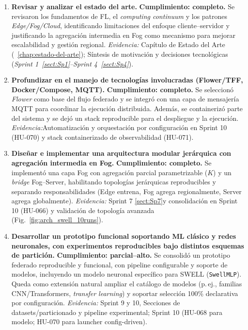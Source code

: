 \documentclass{report}
\begin{document}
\begin{enumerate}\setlength\itemsep{0.40em}

\item \textbf{Revisar y analizar el estado del arte.}  
\textbf{Cumplimiento: completo.} Se revisaron los fundamentos de FL, el \textit{computing continuum} y los patrones \textit{Edge/Fog/Cloud}, identificando limitaciones del enfoque cliente--servidor y justificando la agregación intermedia en Fog como mecanismo para mejorar escalabilidad y gestión regional.  
\textit{Evidencia:} Capítulo de Estado del Arte (~\ref{chap:estado-del-arte}); Síntesis de motivación y decisiones tecnológicas (\textit{Sprint 1~\ref{sect:Sp1}--Sprint 4~\ref{sect:Sp4}}).

\item \textbf{Profundizar en el manejo de tecnologías involucradas (Flower/TFF, Docker/Compose, MQTT).}  
\textbf{Cumplimiento: completo.} Se seleccionó \textit{Flower} como base del flujo federado y se integró con una capa de mensajería MQTT para coordinar la ejecución distribuida. Además, se containerizó parte del sistema y se dejó un stack reproducible para el despliegue y la ejecución.  
\textit{Evidencia:}Automatización y orquestación por configuración en Sprint 10 (HU-070) y stack containerizado de observabilidad (HU-071).

\item \textbf{Diseñar e implementar una arquitectura modular jerárquica con agregación intermedia en Fog.}  
\textbf{Cumplimiento: completo.} Se implementó una capa Fog con agregación parcial parametrizable ($K$) y un \textit{bridge} Fog--Server, habilitando topologías jerárquicas reproducibles y separando responsabilidades (Edge entrena, Fog agrega regionalmente, Server agrega globalmente).  
\textit{Evidencia:} Sprint 7 \ref{sect:Sp7}y consolidación en Sprint 10 (HU-066) y validación de topología avanzada (Fig.~\ref{fig:arch_swell_10runs}).

\item \textbf{Desarrollar un prototipo funcional soportando ML clásico y redes neuronales, con experimentos reproducibles bajo distintos esquemas de partición.}  
\textbf{Cumplimiento: parcial--alto.} Se consolidó un prototipo federado reproducible y funcional, con pipeline configurable y soporte de modelos, incluyendo un modelo neuronal específico para SWELL (\texttt{SwellMLP}). Queda como extensión natural ampliar el catálogo de modelos (p.\,ej., familias CNN/Transformers, \textit{transfer learning}) y soportar selección 100\% declarativa por configuración.  
\textit{Evidencia:} Sprint 9 y 10, Secciones de datasets/particionado y pipeline experimental; Sprint 10 (HU-068 para modelo; HU-070 para launcher config-driven).


\end{enumerate}
\end{document}
